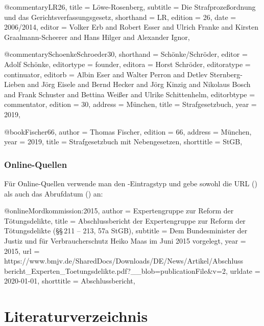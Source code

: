 \documentclass{ltxdockit}[2010/09/26]
\begin{document}
\begin{ltxcode}
@commentary{LR26,
title = {Löwe-Rosenberg},
subtitle = {Die Strafprozeßordnung und das Gerichtsverfassungsgesetz},
shorthand = {LR},
edition = {26},
date = {2006/2014},
editor = {Volker Erb and Robert Esser and Ulrich Franke and%
    Kirsten Graalmann-Scheerer and Hans Hilger and Alexander Ignor},
}

@commentary{SchoenkeSchroeder30,
shorthand = {Schönke/Schröder},
editor = {Adolf Schönke},
editortype = {founder},
editora = {Horst Schröder},
editoratype = {continuator},
editorb = {Albin Eser and Walter Perron and Detlev Sternberg-Lieben%
    and Jörg Eisele and Bernd Hecker and Jörg Kinzig and Nikolaus Bosch%
    and Frank Schuster and Bettina Weißer and Ulrike Schittenhelm},
editorbtype = {commentator},
edition = {30},
address = {München},
title = {Strafgesetzbuch},
year = {2019},
}

@book{Fischer66,
author = {Thomas Fischer},
edition = {66},
address = {München},
year = {2019},
title = {Strafgesetzbuch mit Nebengesetzen},
shorttitle = {StGB},
}
\end{ltxcode}

\subsubsection{Online-Quellen}

Für Online-Quellen verwende man den -Eintragstyp und gebe sowohl die URL () als auch das Abrufdatum () an:

\begin{ltxcode}
@online{Mordkommission:2015,
author = {{Expertengruppe zur Reform der Tötungsdelikte}},
title = {Abschlussbericht der Expertengruppe zur Reform der Tötungsdelikte%
    (§§\,211 -- 213, 57a StGB)},
subtitle = {Dem Bundesminister der Justiz und für Verbraucherschutz Heiko%
    Maas im Juni 2015 vorgelegt},
year = {2015},
url = {https://www.bmjv.de/SharedDocs/Downloads/DE/News/Artikel/Abschluss%
    bericht_Experten_Toetungsdelikte.pdf?__blob=publicationFile&v=2},
urldate = {2020-01-01},
shorttitle = {Abschlussbericht},
}
\end{ltxcode}

\section{Literaturverzeichnis}

\printbibliography[heading=none]{}
\end{document}
